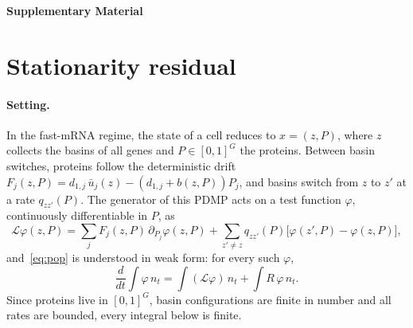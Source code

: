 \documentclass[a4paper, 11pt]{article}
\theoremstyle{plain}
\theoremstyle{remark}
\begin{document}
\ifsimplified\else
\clearpage
\appendix
\renewcommand{\thesection}{S\arabic{section}}
\renewcommand{\theequation}{S\arabic{equation}}
\renewcommand{\theprop}{S\arabic{prop}}
\renewcommand{\thelem}{S\arabic{lem}}
\renewcommand{\therem}{S\arabic{rem}}
\setcounter{equation}{0}
\setcounter{prop}{0}
\setcounter{lem}{0}
\setcounter{rem}{0}
\begin{center}
{\Large\bfseries Supplementary Material}
\end{center}

\section{Stationarity residual}\label{sup:price}

\paragraph{Setting.} In the fast-mRNA regime, the state of a cell reduces to $x = (z, P)$, where $z$ collects the basins of all genes and $P \in [0,1]^G$ the proteins. Between basin switches, proteins follow the deterministic drift $F_j(z, P) = d_{1,j}\,\bar u_j(z) - (d_{1,j} + b(z,P))P_j$, and basins switch from $z$ to $z'$ at a rate $q_{zz'}(P)$. The generator of this PDMP acts on a test function $\varphi$, continuously differentiable in $P$, as
\begin{equation}\label{eq:gen}
\mathcal{L}\varphi(z, P) = \sum_j F_j(z,P)\,\partial_{P_j}\varphi(z,P) + \sum_{z'\neq z} q_{zz'}(P)\bigl[\varphi(z',P) - \varphi(z,P)\bigr],
\end{equation}
and~\eqref{eq:pop} is understood in weak form: for every such $\varphi$,
\begin{equation}\label{eq:pop_weak}
\frac{d}{dt}\int \varphi\, n_t = \int (\mathcal{L}\varphi)\, n_t + \int R\,\varphi\, n_t .
\end{equation}
Since proteins live in $[0,1]^G$, basin configurations are finite in number and all rates are bounded, every integral below is finite.
\end{document}
